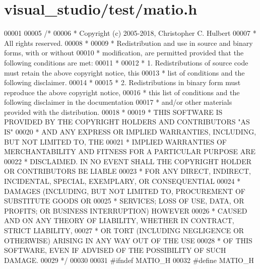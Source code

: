 \hypertarget{visual__studio_2test_2matio_8h_source}{}\section{visual\+\_\+studio/test/matio.h}
\label{visual__studio_2test_2matio_8h_source}

\begin{DoxyCode}
00001 
00005 \textcolor{comment}{/*}
00006 \textcolor{comment}{ * Copyright (c) 2005-2018, Christopher C. Hulbert}
00007 \textcolor{comment}{ * All rights reserved.}
00008 \textcolor{comment}{ *}
00009 \textcolor{comment}{ * Redistribution and use in source and binary forms, with or without}
00010 \textcolor{comment}{ * modification, are permitted provided that the following conditions are met:}
00011 \textcolor{comment}{ *}
00012 \textcolor{comment}{ * 1. Redistributions of source code must retain the above copyright notice, this}
00013 \textcolor{comment}{ *    list of conditions and the following disclaimer.}
00014 \textcolor{comment}{ *}
00015 \textcolor{comment}{ * 2. Redistributions in binary form must reproduce the above copyright notice,}
00016 \textcolor{comment}{ *    this list of conditions and the following disclaimer in the documentation}
00017 \textcolor{comment}{ *    and/or other materials provided with the distribution.}
00018 \textcolor{comment}{ *}
00019 \textcolor{comment}{ * THIS SOFTWARE IS PROVIDED BY THE COPYRIGHT HOLDERS AND CONTRIBUTORS "AS IS"}
00020 \textcolor{comment}{ * AND ANY EXPRESS OR IMPLIED WARRANTIES, INCLUDING, BUT NOT LIMITED TO, THE}
00021 \textcolor{comment}{ * IMPLIED WARRANTIES OF MERCHANTABILITY AND FITNESS FOR A PARTICULAR PURPOSE ARE}
00022 \textcolor{comment}{ * DISCLAIMED. IN NO EVENT SHALL THE COPYRIGHT HOLDER OR CONTRIBUTORS BE LIABLE}
00023 \textcolor{comment}{ * FOR ANY DIRECT, INDIRECT, INCIDENTAL, SPECIAL, EXEMPLARY, OR CONSEQUENTIAL}
00024 \textcolor{comment}{ * DAMAGES (INCLUDING, BUT NOT LIMITED TO, PROCUREMENT OF SUBSTITUTE GOODS OR}
00025 \textcolor{comment}{ * SERVICES; LOSS OF USE, DATA, OR PROFITS; OR BUSINESS INTERRUPTION) HOWEVER}
00026 \textcolor{comment}{ * CAUSED AND ON ANY THEORY OF LIABILITY, WHETHER IN CONTRACT, STRICT LIABILITY,}
00027 \textcolor{comment}{ * OR TORT (INCLUDING NEGLIGENCE OR OTHERWISE) ARISING IN ANY WAY OUT OF THE USE}
00028 \textcolor{comment}{ * OF THIS SOFTWARE, EVEN IF ADVISED OF THE POSSIBILITY OF SUCH DAMAGE.}
00029 \textcolor{comment}{ */}
00030 
00031 \textcolor{preprocessor}{#ifndef MATIO\_H}
00032 \textcolor{preprocessor}{#define MATIO\_H}

\end{DoxyCode}
